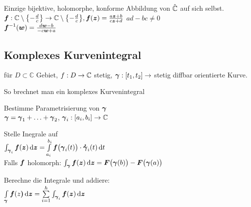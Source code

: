 \documentclass[german,color,6pt]{latex4ei/latex4ei_fs}
\begin{document}
\begin{sectionbox}
	Einzige bijektive, holomorphe, konforme Abbildung von $\hat {\mathbb C}$ auf sich selbst.\\
	$\boldsymbol{f}:\mathbb C \setminus \bigl\{-\frac{d}{c}\bigr\} \rightarrow \mathbb C \setminus \bigl\{-\frac{d}{c}\bigr\}, \boldsymbol{f}(\boldsymbol{z}) = \frac{a\boldsymbol{z} + b}{c\boldsymbol{z} + d}$ \qquad $ad - bc \ne 0$\\ 
	$\boldsymbol{f}^{-1}(\boldsymbol{w}) = \frac{d\boldsymbol{w} - b}{-c \boldsymbol{w} + a}$
\end{sectionbox}

\begin{sectionbox}
	\subsection{Komplexes Kurvenintegral}
	für $D \subset \mathbb C$ Gebiet, $f: D \rightarrow \mathbb C$ stetig, $\boldsymbol{\gamma}: [t_1, t_2] \rightarrow $ stetig diffbar orientierte Kurve. \\ 
	\begin{cookbox}{So brechnet man ein komplexes Kurvenintegral}
		\item Bestimme Parametrisierung von $\boldsymbol{\gamma}$ \\
		$\boldsymbol{\gamma} = \boldsymbol{\gamma}_1 + \ldots + \boldsymbol{\gamma}_2$, $\boldsymbol{\gamma}_i : [a_i, b_i] \rightarrow \mathbb C$
		\item Stelle Inegrale auf \\
		$\int_{\cx \gamma_i} \cx f(\cx z) \diff \cx z = \int \limits_{a_i}^{b_i} \cx f\big(\cx \gamma_i(t)\big) \cdot \dot{\cx \gamma}_i (t) \diff t$\\
		Falls $\boldsymbol{f}$ holomorph: $\int_{\cx \gamma} \cx f(\cx z) \diff \cx z = \cx F\big(\cx \gamma(b)\big) - \cx F\big(\cx \gamma(a)\big)$
		\item Berechne die Integrale und addiere: \\
		$\int \limits_{\cx \gamma} \cx f(z\cx ) \diff \cx z = \sum \limits_{i = 1}^{h} \int_{\cx \gamma_i} \cx f(\cx z) \diff \cx z$
	\end{cookbox}
\end{sectionbox}
\end{document}

